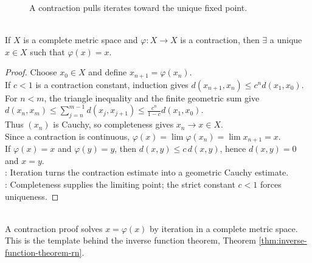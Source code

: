\begin{figure}[H]
  \centering
  
  \caption{A contraction pulls iterates toward the unique fixed point.}
  \label{fig:contraction-fixed-point-iteration}
\end{figure}

\begin{theorem} \label{thm:contraction-principle} \\
If $X$ is a complete metric space and $\varphi:X\to X$ is a contraction, then $\exists$ a unique $x\in X$ such that $\varphi(x)=x$.
\begin{proof}
Choose $x_0\in X$ and define $x_{n+1}=\varphi(x_n)$.\\
If $c<1$ is a contraction constant, induction gives $d(x_{n+1},x_n)\leq c^n d(x_1,x_0)$.\\
For $n<m$, the triangle inequality and the finite geometric sum give $d(x_n,x_m)\leq \sum\limits_{j=n}^{m-1}d(x_j,x_{j+1}) \leq \frac{c^n}{1-c}d(x_1,x_0)$.\\
Thus $(x_n)$ is Cauchy, so completeness gives $x_n\to x\in X$.\\
Since a contraction is continuous, $\varphi(x)=\lim\varphi(x_n)=\lim x_{n+1}=x$.\\
If $\varphi(x)=x$ and $\varphi(y)=y$, then $d(x,y)\leq c\,d(x,y)$, hence $d(x,y)=0$ and $x=y$.\\
: Iteration turns the contraction estimate into a geometric Cauchy estimate.\\
: Completeness supplies the limiting point; the strict constant $c<1$ forces uniqueness.
\end{proof}
\end{theorem}

\begin{perspective} \label{per:contractions-feed-local-analysis} \\
A contraction proof solves $x=\varphi(x)$ by iteration in a complete metric space. This is the template behind the inverse function theorem, Theorem \ref{thm:inverse-function-theorem-rn}.
\end{perspective}

